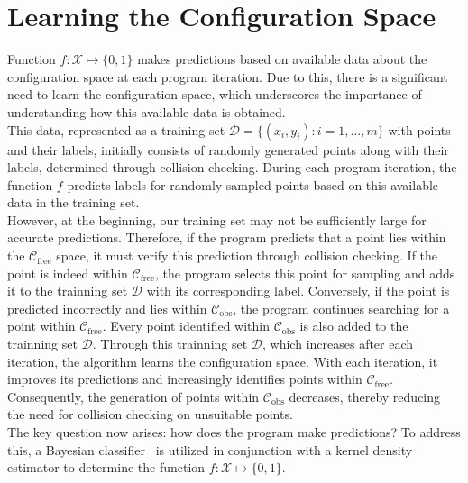 \documentclass{ctuthesis}
\begin{document}
\section{Learning the Configuration Space} 
Function \( f: \mathcal{X} \mapsto \{0,1\} \)  makes predictions based on available data about 
the configuration space at each program iteration. 
Due to this, there is a significant need to learn the configuration space, 
which underscores the importance of understanding how this available data is obtained.
\\[12pt]
This data, represented as a training set  \( \mathcal{D} = \{ (x_i, y_i) : i = 1, \ldots, m \} \) with points and their labels, 
initially consists of randomly generated points along with their labels, 
determined through collision checking. 
During each program iteration, 
the function \( f \) predicts labels for randomly sampled points based on this available data in the training set.
\\[12pt]
However, at the beginning, our training set may not be sufficiently large for accurate predictions. 
Therefore, if the program predicts that a point lies 
within the \( \mathcal{C}_{\text{free}} \) space, 
it must verify this prediction through collision checking. 
If the point is indeed within \( \mathcal{C}_{\text{free}} \), 
the program selects this point for sampling and adds it to the trainning set $\mathcal{D}$ with 
its corresponding label. 
Conversely, if the point is predicted incorrectly and 
lies within \( \mathcal{C}_{\text{obs}} \), 
the program continues searching for a point within \( \mathcal{C}_{\text{free}} \). 
Every point identified within \( \mathcal{C}_{\text{obs}} \) is also added to the trainning set $\mathcal{D}$.
Through this trainning set $\mathcal{D}$, which increases after each iteration, 
the algorithm learns the configuration space. 
With each iteration, it improves its predictions and increasingly identifies points
within \( \mathcal{C}_{\text{free}} \). 
Consequently, the generation of points within \( \mathcal{C}_{\text{obs}} \) decreases, 
thereby reducing the need for collision checking on unsuitable points.
\\[12pt]
The key question now arises: how does the program make predictions? 
To address this, 
a Bayesian classifier~\cite{Bishop2006Pattern} is utilized in conjunction 
with a kernel density estimator to determine the function \( f: \mathcal{X} \mapsto \{0,1\} \).
\end{document}
